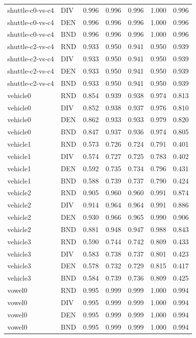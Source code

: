 \documentclass[10pt,a4paper]{article}
\begin{document}
\begin{longtable}{lllllrr}
shuttle-c0-vs-c4 & DIV & 0.996 & 0.996 & 0.996 & 1.000 & 0.996 \\
shuttle-c0-vs-c4 & DEN & 0.996 & 0.996 & 0.996 & 1.000 & 0.996 \\
shuttle-c0-vs-c4 & BND & 0.996 & 0.996 & 0.996 & 1.000 & 0.996 \\
shuttle-c2-vs-c4 & RND & 0.933 & 0.950 & 0.941 & 0.950 & 0.939 \\
shuttle-c2-vs-c4 & DIV & 0.933 & 0.950 & 0.941 & 0.950 & 0.939 \\
shuttle-c2-vs-c4 & DEN & 0.933 & 0.950 & 0.941 & 0.950 & 0.939 \\
shuttle-c2-vs-c4 & BND & 0.933 & 0.950 & 0.941 & 0.950 & 0.939 \\
vehicle0 & RND & 0.854 & 0.939 & 0.938 & 0.974 & 0.813 \\
vehicle0 & DIV & 0.852 & 0.938 & 0.937 & 0.976 & 0.810 \\
vehicle0 & DEN & 0.862 & 0.933 & 0.933 & 0.979 & 0.820 \\
vehicle0 & BND & 0.847 & 0.937 & 0.936 & 0.974 & 0.805 \\
vehicle1 & RND & 0.573 & 0.726 & 0.724 & 0.791 & 0.401 \\
vehicle1 & DIV & 0.574 & 0.727 & 0.725 & 0.783 & 0.402 \\
vehicle1 & DEN & 0.592 & 0.735 & 0.734 & 0.796 & 0.431 \\
vehicle1 & BND & 0.588 & 0.739 & 0.737 & 0.790 & 0.424 \\
vehicle2 & RND & 0.905 & 0.960 & 0.960 & 0.991 & 0.874 \\
vehicle2 & DIV & 0.914 & 0.964 & 0.964 & 0.991 & 0.886 \\
vehicle2 & DEN & 0.930 & 0.966 & 0.965 & 0.990 & 0.906 \\
vehicle2 & BND & 0.881 & 0.948 & 0.947 & 0.988 & 0.843 \\
vehicle3 & RND & 0.590 & 0.744 & 0.742 & 0.809 & 0.433 \\
vehicle3 & DIV & 0.583 & 0.738 & 0.737 & 0.801 & 0.423 \\
vehicle3 & DEN & 0.578 & 0.732 & 0.729 & 0.815 & 0.417 \\
vehicle3 & BND & 0.584 & 0.739 & 0.736 & 0.809 & 0.425 \\
vowel0 & RND & 0.995 & 0.999 & 0.999 & 1.000 & 0.994 \\
vowel0 & DIV & 0.995 & 0.999 & 0.999 & 1.000 & 0.994 \\
vowel0 & DEN & 0.995 & 0.999 & 0.999 & 1.000 & 0.994 \\
vowel0 & BND & 0.995 & 0.999 & 0.999 & 1.000 & 0.994 \\

\end{longtable}
\end{document}
